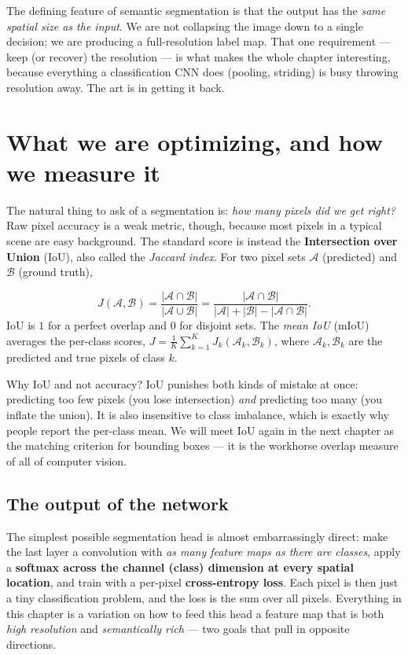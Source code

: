 \documentclass[11pt, oneside]{book}
\begin{document}
The defining feature of semantic segmentation is that the output has the
\emph{same spatial size as the input}. We are not collapsing the image down to a
single decision; we are producing a full-resolution label map. That one
requirement --- keep (or recover) the resolution --- is what makes the whole
chapter interesting, because everything a classification CNN does (pooling,
striding) is busy throwing resolution away. The art is in getting it back.

\section{What we are optimizing, and how we measure it}

The natural thing to ask of a segmentation is: \emph{how many pixels did we get
right?} Raw pixel accuracy is a weak metric, though, because most pixels in a
typical scene are easy background. The standard score is instead the
\textbf{Intersection over Union} (IoU), also called the \emph{Jaccard index}.
For two pixel sets $\mathcal{A}$ (predicted) and $\mathcal{B}$ (ground truth),

\begin{thmbox}[title={Intersection over Union (Jaccard index)}]
\[
  J(\mathcal{A},\mathcal{B})
  = \frac{|\mathcal{A} \cap \mathcal{B}|}{|\mathcal{A} \cup \mathcal{B}|}
  = \frac{|\mathcal{A} \cap \mathcal{B}|}
         {|\mathcal{A}| + |\mathcal{B}| - |\mathcal{A} \cap \mathcal{B}|}.
\]
IoU is $1$ for a perfect overlap and $0$ for disjoint sets. The
\emph{mean IoU} (mIoU) averages the per-class scores,
$J = \frac{1}{K}\sum_{k=1}^{K} J_k(\mathcal{A}_k,\mathcal{B}_k)$,
where $\mathcal{A}_k,\mathcal{B}_k$ are the predicted and true pixels of class $k$.
\end{thmbox}

Why IoU and not accuracy? IoU punishes both kinds of mistake at once: predicting
too few pixels (you lose intersection) \emph{and} predicting too many (you inflate
the union). It is also insensitive to class imbalance, which is exactly why
people report the per-class mean. We will meet IoU again in the next chapter as
the matching criterion for bounding boxes --- it is the workhorse overlap measure
of all of computer vision.

\subsection{The output of the network}

The simplest possible segmentation head is almost embarrassingly direct:
make the last layer a convolution with \emph{as many feature maps as there are
classes}, apply a \textbf{softmax across the channel (class) dimension at every
spatial location}, and train with a per-pixel \textbf{cross-entropy loss}.
Each pixel is then just a tiny classification problem, and the loss is the sum
over all pixels. Everything in this chapter is a variation on how to feed this
head a feature map that is both \emph{high resolution} and \emph{semantically
rich} --- two goals that pull in opposite directions.
\end{document}
